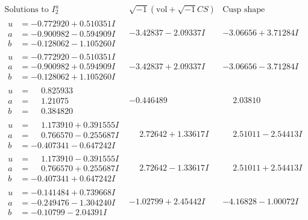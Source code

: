 \documentclass[1p]{elsarticle_modified}
\theoremstyle{definition}
\newcommand{\I}{\sqrt{-1}}
\begin{document}
$$\begin{array}{c|c|c}  
\text{Solutions to }I^u_{2}& \I (\text{vol} + \sqrt{-1}CS) & \text{Cusp shape}\\
 \hline 
\begin{aligned}
u &= -0.772920 + 0.510351 I \\
a &= -0.900982 - 0.594909 I \\
b &= -0.128062 - 1.105260 I\end{aligned}
 & -3.42837 - 2.09337 I & -3.06656 + 3.71284 I \\ \hline\begin{aligned}
u &= -0.772920 - 0.510351 I \\
a &= -0.900982 + 0.594909 I \\
b &= -0.128062 + 1.105260 I\end{aligned}
 & -3.42837 + 2.09337 I & -3.06656 - 3.71284 I \\ \hline\begin{aligned}
u &= \phantom{-}0.825933\phantom{ +0.000000I} \\
a &= \phantom{-}1.21075\phantom{ +0.000000I} \\
b &= \phantom{-}0.384820\phantom{ +0.000000I}\end{aligned}
 & -0.446489\phantom{ +0.000000I} & \phantom{-}2.03810\phantom{ +0.000000I} \\ \hline\begin{aligned}
u &= \phantom{-}1.173910 + 0.391555 I \\
a &= \phantom{-}0.766570 - 0.255687 I \\
b &= -0.407341 - 0.647242 I\end{aligned}
 & \phantom{-}2.72642 + 1.33617 I & \phantom{-}2.51011 - 2.54413 I \\ \hline\begin{aligned}
u &= \phantom{-}1.173910 - 0.391555 I \\
a &= \phantom{-}0.766570 + 0.255687 I \\
b &= -0.407341 + 0.647242 I\end{aligned}
 & \phantom{-}2.72642 - 1.33617 I & \phantom{-}2.51011 + 2.54413 I \\ \hline\begin{aligned}
u &= -0.141484 + 0.739668 I \\
a &= -0.249476 - 1.304240 I \\
b &= -0.10799 - 2.04391 I\end{aligned}
 & -1.02799 + 2.45442 I & -4.16828 - 1.00072 I \\ \hline\begin{aligned}

\end{aligned}
\end{array}$$
\end{document}
